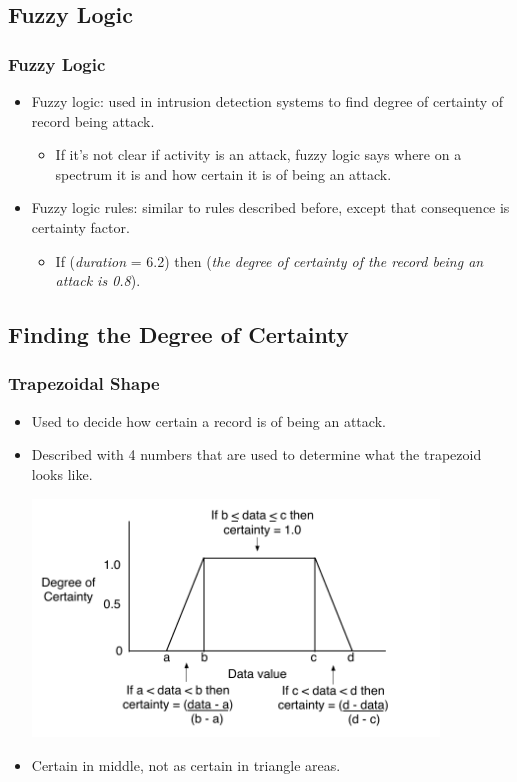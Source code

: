 \documentclass{beamer}
\newcommand{\linespace}{\vskip 0.25cm}
\begin{document}
\subsection{Fuzzy Logic}
\begin{frame}
	\frametitle{Fuzzy Logic}
	\begin{itemize}
		\item Fuzzy logic: used in intrusion detection systems to find degree of certainty of record being attack.
			\begin{itemize}
				\item If it's not clear if activity is an attack, fuzzy logic says where on a spectrum it is and how certain it is of being an attack.
			\end{itemize}
		\linespace
		\linespace
		\linespace
		\item Fuzzy logic rules: similar to rules described before, except that
consequence is certainty factor. 
		\begin{itemize}
			\item If (\emph{duration} = 6.2) then (\emph{the degree of certainty of the record being an attack is 0.8}).
		\end{itemize}
	\end{itemize}
\end{frame}

\subsection{Finding the Degree of Certainty}
\begin{frame}
  \frametitle{Trapezoidal Shape}
	\begin{itemize}
		\item Used to decide how certain a record is of being an attack.
		\item Described with 4 numbers that are used to determine what the trapezoid looks like.
		\begin{center}
		  \includegraphics[width=0.85\textwidth]{../trapFigTemplate.pdf}		
		\end{center}
		\item Certain in middle, not as certain in triangle areas.
	\end{itemize}
\end{frame}
\end{document}
